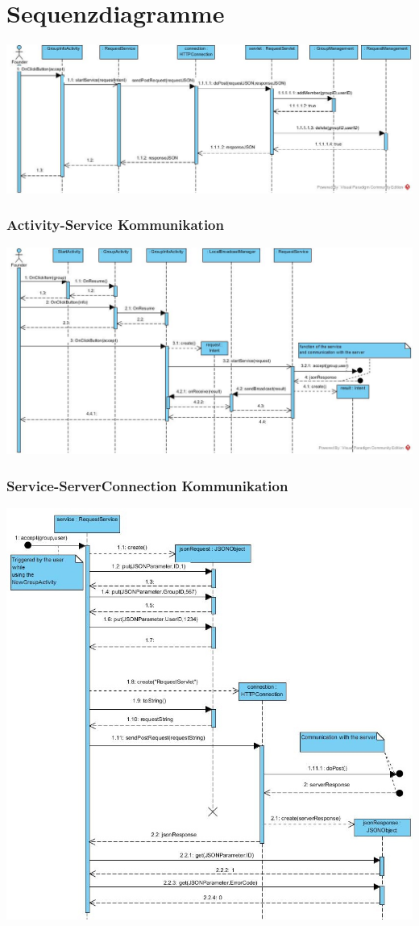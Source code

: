 \section{Sequenzdiagramme}

\includegraphics[width=1.1\textwidth]{addMemberSequenceDiagram.jpg}

\subsubsection{Activity-Service Kommunikation}
	\includegraphics[width=1.1\textwidth]{Activity_Service.jpg}
	
\subsubsection{Service-ServerConnection Kommunikation}
\includegraphics[width=1.1\textwidth]{Service_ServerConnection.jpg}

